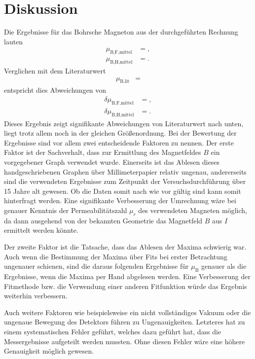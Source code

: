 \section{Diskussion}
\label{sec:Diskussion}

Die Ergebnisse für das Bohrsche Magneton aus der durchgeführten Rechnung lauten
\begin{align*}
  \mu_{\text{B,F,mittel}} &= ,\\
  \mu_{\text{B,H,mittel}} &= .
\end{align*}
Verglichen mit dem Literaturwert \cite{Konstanten}
\begin{align*}
  \mu_{\text{B,lit}} &= 
\end{align*}
entspricht dies Abweichungen von
\begin{align*}
  \delta \mu_{\text{B,F,mittel}} &= ,\\
  \delta \mu_{\text{B,H,mittel}} &= .
\end{align*}
Dieses Ergebnis zeigt signifikante Abweichungen von Literaturwert nach unten, liegt trotz allem noch in der gleichen Größenordnung.
Bei der Bewertung der Ergebnisse sind vor allem zwei entscheidende Faktoren zu nennen.
Der erste Faktor ist der Sachverhalt, dass zur Ermittlung des Magnetfeldes $B$ ein vorgegebener Graph verwendet wurde.
Einerseits ist das Ablesen dieses handgeschriebenen Graphen über Millimeterpapier relativ ungenau, andererseits sind die verwendeten Ergebnisse zum Zeitpunkt der Versuchsdurchführung über 15 Jahre alt gewesen.
Ob die Daten somit nach wie vor gültig sind kann somit hinterfragt werden.
Eine signifikante Verbesserung der Umrechnung wäre bei genauer Kenntnis der Permeabilitätszahl $\mu_r$ des verwendeten Magneten möglich, da dann ausgehend von der bekannten Geometrie das Magnetfeld $B$ aus $I$ ermittelt werden könnte.

Der zweite Faktor ist die Tatsache, dass das Ablesen der Maxima schwierig war.
Auch wenn die Bestimmung der Maxima über Fits bei erster Betrachtung ungenauer schienen, sind die daraus folgenden Ergebnisse für $\mu_\text{B}$ genauer als die Ergebnisse, wenn die Maxima per Hand abgelesen werden.
Eine Verbesserung der Fitmethode bzw. die Verwendung einer anderen Fitfunktion würde das Ergebnis weiterhin verbessern.

Auch weitere Faktoren wie beispielsweise ein nicht vollständiges Vakuum oder die ungenaue Bewegung des Detektors führen zu Ungenauigkeiten.
Letzteres hat zu einem systematischen Fehler geführt, welches dazu geführt hat, dass die Messergebnisse aufgeteilt werden mussten.
Ohne diesen Fehler wäre eine höhere Genauigkeit möglich gewesen.
